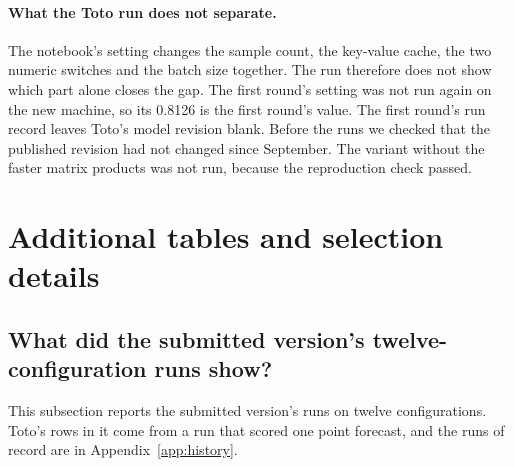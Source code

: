 \documentclass{article}
\begin{document}
\paragraph{What the Toto run does not separate.} The notebook's setting changes the sample
count, the key-value cache, the two numeric switches and the batch size together. The run
therefore does not show which part alone closes the gap. The first round's setting was not run
again on the new machine, so its 0.8126 is the first round's value. The first round's run
record leaves Toto's model revision blank. Before the runs we checked that the published
revision had not changed since September. The variant without the faster matrix products was
not run, because the reproduction check passed.


\section{Additional tables and selection details}
\label{app:tables}

\subsection{What did the submitted version's twelve-configuration runs show?}
\label{app:gridfull}

This subsection reports the submitted version's runs on twelve configurations. Toto's rows
in it come from a run that scored one point forecast, and the runs of record are in
Appendix~\ref{app:history}.
\end{document}
